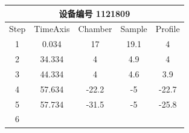 \documentclass[UTF8,10pt,a4paper,fontset=fandol]{ctexart}
\newcommand{\fieldvalue}[1]{#1}
\begin{document}
\smallskip

\begin{center}
\begin{tabular}{|c|c|c|c|c|}
\hline
\multicolumn{5}{|c|}{设备编号\quad
\fieldvalue{1121809}}\\
\hline
Step & TimeAxis & Chamber & Sample & Profile\\
\hline
\fieldvalue{1} &
\fieldvalue{0.034} &
\fieldvalue{17} &
\fieldvalue{19.1} &
\fieldvalue{4}\\
\hline
\fieldvalue{2} &
\fieldvalue{34.334} &
\fieldvalue{4} &
\fieldvalue{4.9} &
\fieldvalue{4}\\
\hline
\fieldvalue{3} &
\fieldvalue{44.334} &
\fieldvalue{4} &
\fieldvalue{4.6} &
\fieldvalue{3.9}\\
\hline
\fieldvalue{4} &
\fieldvalue{57.634} &
\fieldvalue{-22.2} &
\fieldvalue{-5} &
\fieldvalue{-22.7}\\
\hline
\fieldvalue{5} &
\fieldvalue{57.734} &
\fieldvalue{-31.5} &
\fieldvalue{-5} &
\fieldvalue{-25.8}\\
\hline
\fieldvalue{6} &

\end{tabular}
\end{center}
\end{document}
